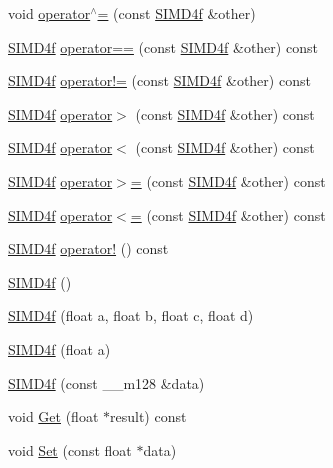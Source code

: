 \begin{DoxyCompactItemize}
\item 
void \hyperlink{class_s_i_m_d4f_a27c17c6b57f44045fb33c0427e33210b}{operator$^\wedge$=} (const \hyperlink{class_s_i_m_d4f}{S\+I\+M\+D4f} \&other)
\item 
\hyperlink{class_s_i_m_d4f}{S\+I\+M\+D4f} \hyperlink{class_s_i_m_d4f_ade3596e82e7765959b1c4d88b6677d5e}{operator==} (const \hyperlink{class_s_i_m_d4f}{S\+I\+M\+D4f} \&other) const 
\item 
\hyperlink{class_s_i_m_d4f}{S\+I\+M\+D4f} \hyperlink{class_s_i_m_d4f_a57b8179ec1d84168c1652b5426fa3a23}{operator!=} (const \hyperlink{class_s_i_m_d4f}{S\+I\+M\+D4f} \&other) const 
\item 
\hyperlink{class_s_i_m_d4f}{S\+I\+M\+D4f} \hyperlink{class_s_i_m_d4f_aa82f83875606b53854dda2484561c435}{operator$>$} (const \hyperlink{class_s_i_m_d4f}{S\+I\+M\+D4f} \&other) const 
\item 
\hyperlink{class_s_i_m_d4f}{S\+I\+M\+D4f} \hyperlink{class_s_i_m_d4f_ad94926234ab8e74f007d137135ef6990}{operator$<$} (const \hyperlink{class_s_i_m_d4f}{S\+I\+M\+D4f} \&other) const 
\item 
\hyperlink{class_s_i_m_d4f}{S\+I\+M\+D4f} \hyperlink{class_s_i_m_d4f_ab335c298dcef73b1e1e67500bfc5cbea}{operator$>$=} (const \hyperlink{class_s_i_m_d4f}{S\+I\+M\+D4f} \&other) const 
\item 
\hyperlink{class_s_i_m_d4f}{S\+I\+M\+D4f} \hyperlink{class_s_i_m_d4f_a58edb1a5141a88422c789201633c22fc}{operator$<$=} (const \hyperlink{class_s_i_m_d4f}{S\+I\+M\+D4f} \&other) const 
\item 
\hyperlink{class_s_i_m_d4f}{S\+I\+M\+D4f} \hyperlink{class_s_i_m_d4f_af9f8304a6372911aae73c04bae766dc8}{operator!} () const 
\item 
\hyperlink{class_s_i_m_d4f_abda4aa81a62d1573aba11dcd1e381864}{S\+I\+M\+D4f} ()
\item 
\hyperlink{class_s_i_m_d4f_a9997f26840dc7bfb7eeb818c9a87d367}{S\+I\+M\+D4f} (float a, float b, float c, float d)
\item 
\hyperlink{class_s_i_m_d4f_a10e3822b07aad4fb7988762107cd9234}{S\+I\+M\+D4f} (float a)
\item 
\hyperlink{class_s_i_m_d4f_ac549a6be599e9f749ad55cb02c3eb6d4}{S\+I\+M\+D4f} (const \+\_\+\+\_\+m128 \&data)
\item 
void \hyperlink{class_s_i_m_d4f_a8cd99451df52ad40c4dfdd79a63364bd}{Get} (float $\ast$result) const 
\item 
void \hyperlink{class_s_i_m_d4f_aa023e7d4ac74e0f9a4aecd0795958583}{Set} (const float $\ast$data)

\end{DoxyCompactItemize}
